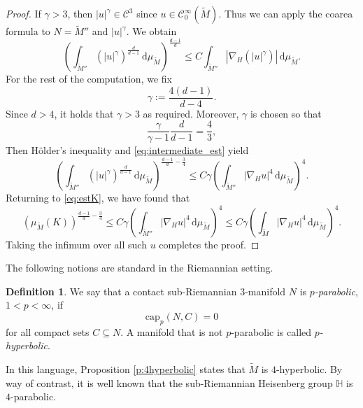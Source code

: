 \documentclass[10pt,letterpaper]{amsart}
\theoremstyle{definition}
\newtheorem{definition}[thm]{Definition}
\numberwithin{thm}{subsection}
\numberwithin{equation}{section}
\begin{document}
\begin{proof}
If $\gamma>3$, then $|u|^{\gamma}\in \mathcal{C}^3$ since $u\in \mathcal{C}^{\infty}_0(\widetilde{M})$.
Thus we can apply the coarea formula to $N=\widetilde{M}''$ and $|u|^{\gamma}$. We obtain
\begin{equation}\label{eq:intermediate_est}
\left(\int_{\widetilde{M}''} \left(|u|^{\gamma}\right)^{\frac{d}{d-1}}\,\mathrm{d}\mu_{\widetilde{M}}\right)^{\frac{d-1}{d}}\leq C \int_{\widetilde{M}''}
|\nabla_H(|u|^{\gamma})|\,\mathrm{d}\mu_{\widetilde{M}}.
\end{equation}
For the rest of the computation, we fix
\begin{displaymath}
\gamma:= \frac{4(d-1)}{d-4}.
\end{displaymath}
Since $d>4$, it holds that $\gamma > 3$ as required. Moreover, $\gamma$ is chosen so that
\begin{displaymath}
\frac{\gamma}{\gamma-1}\frac{d}{d-1}= \frac{4}{3},
\end{displaymath}
Then H\"older's inequality and \eqref{eq:intermediate_est}
yield
\begin{displaymath}
\left(\int_{\widetilde{M}''} \left(|u|^{\gamma}\right)^{\frac{d}{d-1}}\,\mathrm{d}\mu_{\widetilde{M}}\right)^{\frac{d-1}{d}-\frac{3}{4}}\leq C \gamma \left(\int_{\widetilde{M}''} |\nabla_H u|^4\,\mathrm{d}\mu_{\widetilde{M}}\right)^4.
\end{displaymath}
Returning to \eqref{eq:estK}, we have found that
\begin{displaymath}
\left(\mu_{\widetilde{M}}(K)\right)^{\frac{d-1}{d}-\frac{3}{4}}\leq C \gamma \left(\int_{\widetilde{M}''} |\nabla_H u|^4\,\mathrm{d}\mu_{\widetilde{M}}\right)^4\leq C \gamma \left(\int_{\widetilde{M}} |\nabla_H u|^4\,\mathrm{d}\mu_{\widetilde{M}}\right)^4.
\end{displaymath}
Taking the infimum over all such $u$ completes the proof.
\end{proof}

The following notions are standard in the Riemannian setting.

\begin{definition}
We say that a contact sub-Riemannian $3$-manifold $N$ is \emph{$p$-parabolic}, $1<p<\infty$, if
\begin{displaymath}
\mathrm{cap}_p(N,C)=0
\end{displaymath}
for all compact sets $C\subseteq N$. A manifold that is not $p$-parabolic is called \emph{$p$-hyperbolic}.
\end{definition}

In this language, Proposition \ref{p:4hyperbolic} states that $\widetilde{M}$ is $4$-hyperbolic. By way of contrast, it is well known \cite[p.130]{MR1630785} that the sub-Riemannian Heisenberg group ${\mathbb H}$ is $4$-parabolic.
\end{document}
